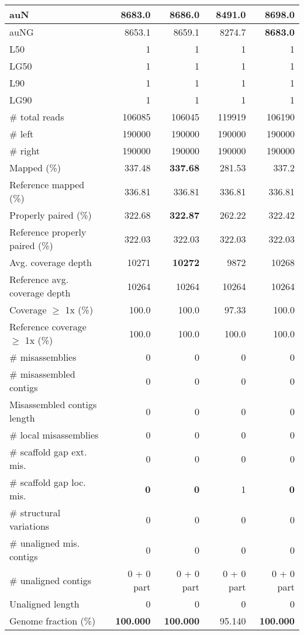 \documentclass[12pt,a4paper]{article}
\begin{document}
\begin{table}[ht]
\begin{center}
\begin{tabular}{|l*{4}{|r}|}
auN & 8683.0 & 8686.0 & 8491.0 & {\bf 8698.0} \\ \hline
auNG & 8653.1 & 8659.1 & 8274.7 & {\bf 8683.0} \\ \hline
L50 & 1 & 1 & 1 & 1 \\ \hline
LG50 & 1 & 1 & 1 & 1 \\ \hline
L90 & 1 & 1 & 1 & 1 \\ \hline
LG90 & 1 & 1 & 1 & 1 \\ \hline
\# total reads & 106085 & 106045 & 119919 & 106190 \\ \hline
\# left & 190000 & 190000 & 190000 & 190000 \\ \hline
\# right & 190000 & 190000 & 190000 & 190000 \\ \hline
Mapped (\%) & 337.48 & {\bf 337.68} & 281.53 & 337.2 \\ \hline
Reference mapped (\%) & 336.81 & 336.81 & 336.81 & 336.81 \\ \hline
Properly paired (\%) & 322.68 & {\bf 322.87} & 262.22 & 322.42 \\ \hline
Reference properly paired (\%) & 322.03 & 322.03 & 322.03 & 322.03 \\ \hline
Avg. coverage depth & 10271 & {\bf 10272} & 9872 & 10268 \\ \hline
Reference avg. coverage depth & 10264 & 10264 & 10264 & 10264 \\ \hline
Coverage $\geq$ 1x (\%) & 100.0 & 100.0 & 97.33 & 100.0 \\ \hline
Reference coverage $\geq$ 1x (\%) & 100.0 & 100.0 & 100.0 & 100.0 \\ \hline
\# misassemblies & 0 & 0 & 0 & 0 \\ \hline
\# misassembled contigs & 0 & 0 & 0 & 0 \\ \hline
Misassembled contigs length & 0 & 0 & 0 & 0 \\ \hline
\# local misassemblies & 0 & 0 & 0 & 0 \\ \hline
\# scaffold gap ext. mis. & 0 & 0 & 0 & 0 \\ \hline
\# scaffold gap loc. mis. & {\bf 0} & {\bf 0} & 1 & {\bf 0} \\ \hline
\# structural variations & 0 & 0 & 0 & 0 \\ \hline
\# unaligned mis. contigs & 0 & 0 & 0 & 0 \\ \hline
\# unaligned contigs & 0 + 0 part & 0 + 0 part & 0 + 0 part & 0 + 0 part \\ \hline
Unaligned length & 0 & 0 & 0 & 0 \\ \hline
Genome fraction (\%) & {\bf 100.000} & {\bf 100.000} & 95.140 & {\bf 100.000} \\ \hline

\end{tabular}
\end{center}
\end{table}
\end{document}
